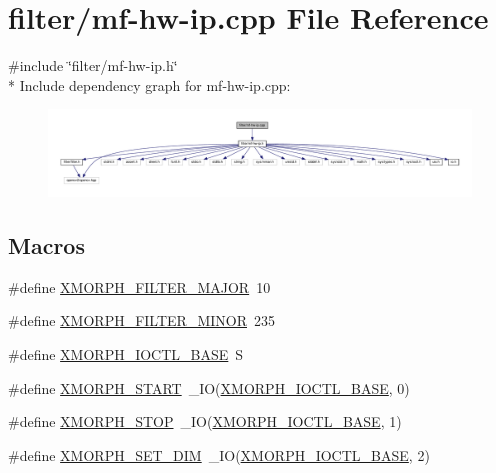 \hypertarget{mf-hw-ip_8cpp}{}\section{filter/mf-\/hw-\/ip.cpp File Reference}
\label{mf-hw-ip_8cpp}
{\ttfamily \#include \char`\"{}filter/mf-\/hw-\/ip.\+h\char`\"{}}\\*
Include dependency graph for mf-\/hw-\/ip.cpp\+:
\nopagebreak
\begin{figure}[H]
\begin{center}
\leavevmode
\includegraphics[width=350pt]{mf-hw-ip_8cpp__incl}
\end{center}
\end{figure}
\subsection*{Macros}
\begin{DoxyCompactItemize}
\item 
\#define \hyperlink{mf-hw-ip_8cpp_a525dc690f9b3aa98bfd8582d1834c592}{X\+M\+O\+R\+P\+H\+\_\+\+F\+I\+L\+T\+E\+R\+\_\+\+M\+A\+J\+OR}~10
\item 
\#define \hyperlink{mf-hw-ip_8cpp_a946c0d3be28eea0aa395341d5edad23b}{X\+M\+O\+R\+P\+H\+\_\+\+F\+I\+L\+T\+E\+R\+\_\+\+M\+I\+N\+OR}~235
\item 
\#define \hyperlink{mf-hw-ip_8cpp_a98531e30a77186fa74d7dd16ab7b4763}{X\+M\+O\+R\+P\+H\+\_\+\+I\+O\+C\+T\+L\+\_\+\+B\+A\+SE}~\textquotesingle{}S\textquotesingle{}
\item 
\#define \hyperlink{mf-hw-ip_8cpp_a9a30fd1ea7ebb580f4ffef098336f73f}{X\+M\+O\+R\+P\+H\+\_\+\+S\+T\+A\+RT}~\+\_\+\+IO(\hyperlink{mf-hw-ip_8cpp_a98531e30a77186fa74d7dd16ab7b4763}{X\+M\+O\+R\+P\+H\+\_\+\+I\+O\+C\+T\+L\+\_\+\+B\+A\+SE}, 0)
\item 
\#define \hyperlink{mf-hw-ip_8cpp_a1048583f6fc600a2b3b2c86b4b569a98}{X\+M\+O\+R\+P\+H\+\_\+\+S\+T\+OP}~\+\_\+\+IO(\hyperlink{mf-hw-ip_8cpp_a98531e30a77186fa74d7dd16ab7b4763}{X\+M\+O\+R\+P\+H\+\_\+\+I\+O\+C\+T\+L\+\_\+\+B\+A\+SE}, 1)
\item 
\#define \hyperlink{mf-hw-ip_8cpp_ad188c24482b068bac7d3dc2bb106bbfb}{X\+M\+O\+R\+P\+H\+\_\+\+S\+E\+T\+\_\+\+D\+IM}~\+\_\+\+IO(\hyperlink{mf-hw-ip_8cpp_a98531e30a77186fa74d7dd16ab7b4763}{X\+M\+O\+R\+P\+H\+\_\+\+I\+O\+C\+T\+L\+\_\+\+B\+A\+SE}, 2)
\end{DoxyCompactItemize}


